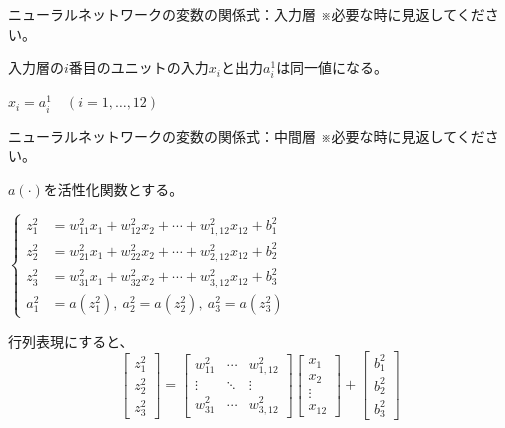 \documentclass[dvipdfmx,aspectratio=169]{beamer}
\begin{document}
	\begin{frame}[allowframebreaks]{ニューラルネットワークの変数の関係式：入力層}
		※必要な時に見返してください。\vspace{4em}
		
		入力層の$ i $番目のユニットの入力$ x_i $と出力$ a^1_i $は同一値になる。
		\begin{screen}
			$ x_i = a^1_i\quad (i=1, \dots, 12) $
		\end{screen}
	\end{frame}
	\begin{frame}[allowframebreaks]{ニューラルネットワークの変数の関係式：中間層}
		※必要な時に見返してください。\vspace{1em}
		
		$ a(\cdot) $を活性化関数とする。
		\begin{screen}
			$ \left\{
			\begin{aligned}
				z^2_1 &= w^2_{11}x_1 + w^2_{12}x_2 + \cdots + w^2_{1,12}x_{12} + b^2_1\\
				z^2_2 &= w^2_{21}x_1 + w^2_{22}x_2 + \cdots + w^2_{2,12}x_{12} + b^2_2\\
				z^2_3 &= w^2_{31}x_1 + w^2_{32}x_2 + \cdots + w^2_{3,12}x_{12} + b^2_3\\
				a^2_1 &= a(z^2_1),\ a^2_2 = a(z^2_2),\ a^2_3 = a(z^2_3)
			\end{aligned}
			\right. $
		\end{screen}
		行列表現にすると、
		\begin{equation*}
			\begin{bmatrix}
			z^2_1\\ z^2_2\\ z^2_3
			\end{bmatrix} = \begin{bmatrix}
				w^2_{11} 	& \cdots & w^2_{1,12}\\
				\vdots 		& \ddots & \vdots\\
				w^2_{31}	& \cdots & w^2_{3,12}
			\end{bmatrix} \begin{bmatrix}
				x_1\\ x_2\\ \vdots\\ x_{12}
			\end{bmatrix} + \begin{bmatrix}
				b^2_1\\ b^2_2\\ b^2_3
			\end{bmatrix}
		\end{equation*}

\end{frame}
\end{document}

